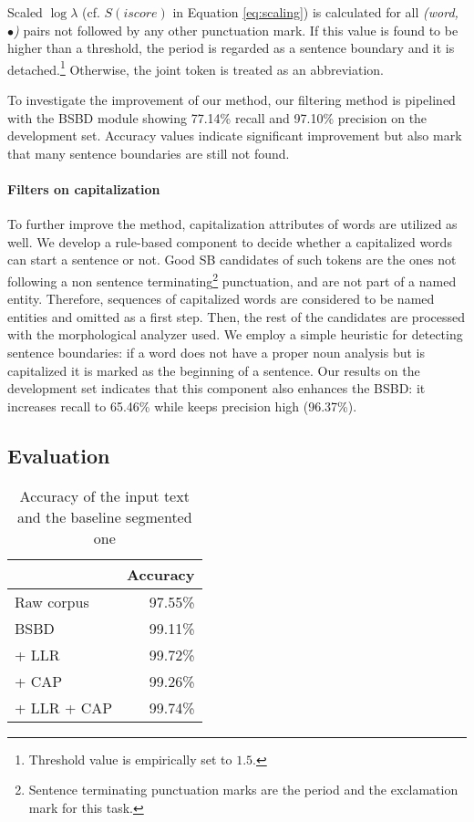 Scaled $\log \lambda$ (cf. $S(iscore)$ in Equation \eqref{eq:scaling}) is calculated for all \emph{(word, $\bullet$)} pairs not followed by any other punctuation mark. 
If this value is found to be higher than a threshold, the period is regarded as a sentence boundary and it is detached.\footnote{Threshold value is empirically set to $1.5$.} 
Otherwise, the joint token is treated as an abbreviation.

To investigate the improvement of our method, our filtering method is pipelined with the BSBD module showing 77.14\% recall and 97.10\% precision on the development set. 
Accuracy values indicate significant improvement but also mark that many sentence boundaries are still not found.

\paragraph{Filters on capitalization}

To further improve the method, capitalization attributes of words are utilized as well. 
We develop a rule-based component to decide whether a capitalized words can start a sentence or not.
Good SB candidates of such tokens are the ones not following a non sentence terminating\footnote{Sentence terminating punctuation marks are the period and the exclamation mark for this task.} punctuation, and are not part of a named entity. 
Therefore, sequences of capitalized words are considered to be named entities and omitted as a first step. 
Then, the rest of the candidates are processed with the morphological analyzer used.
We employ a simple heuristic for detecting sentence boundaries:
if a word does not have a proper noun analysis but is capitalized it is marked as the beginning of a sentence.  
Our results on the development set indicates that this component also enhances the BSBD: it increases recall to 65.46\% while keeps precision high (96.37\%). 

\subsection{Evaluation}


\begin{table}[h]
\centering
\caption{Accuracy of the input text and the baseline segmented one}
\label{tab:base}
\begin{tabular}{ l  r } 
\hline
& Accuracy \\ 
\hline
Raw corpus  & 97.55\% \\
BSBD & 99.11\% \\
+ LLR & 99.72\% \\
+ CAP & 99.26\% \\
+ LLR + CAP & 99.74\% \\
\hline
\end{tabular}
\end{table}

